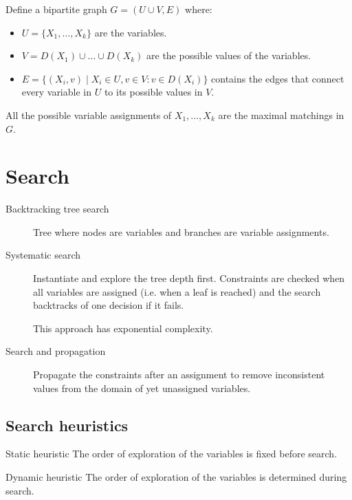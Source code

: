 \begin{descriptionlist}
\begin{example}
            Define a bipartite graph $G=(U \cup V, E)$ where:
            \begin{itemize}
                \item $U = \{ X_1, \dots, X_k \}$ are the variables.
                \item $V = D(X_1) \cup \dots \cup D(X_k)$ are the possible values of the variables.
                \item $E = \{ (X_i, v) \mid X_i \in U, v \in V: v \in D(X_i) \}$ 
                    contains the edges that connect every variable in $U$ to its possible values in $V$.
            \end{itemize} 

            All the possible variable assignments of $X_1, \dots, X_k$ are the maximal matchings in $G$.
        \end{example}
\end{descriptionlist}



\section{Search}


\begin{description}
    \item[Backtracking tree search] 
        Tree where nodes are variables and branches are variable assignments.

    \item[Systematic search] 
        Instantiate and explore the tree depth first.
        Constraints are checked when all variables are assigned (i.e. when a leaf is reached)
        and the search backtracks of one decision if it fails.

        This approach has exponential complexity.

    \item[Search and propagation] 
        Propagate the constraints after an assignment to 
        remove inconsistent values from the domain of yet unassigned variables.
\end{description}


\subsection{Search heuristics}

\begin{descriptionlist}
    \item[Static heuristic] 
        The order of exploration of the variables is fixed before search.

    \item[Dynamic heuristic]  
        The order of exploration of the variables is determined during search.
\end{descriptionlist}


